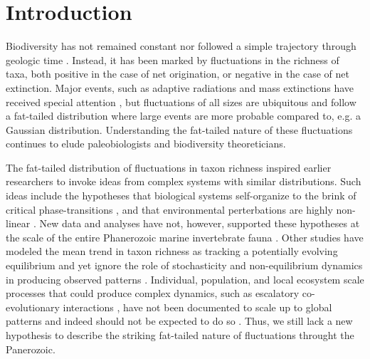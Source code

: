 \documentclass[12pt]{article}
\let\citep=\cite
\begin{document}
\section{Introduction}

Biodiversity has not remained constant nor followed a simple
trajectory through geologic time \citep{raup1982, sepkoski1984,
  gilinsky1994, liow2007, alroy08}.  Instead, it has been marked by
fluctuations in the richness of taxa, both positive in the case of net
origination, or negative in the case of net extinction. Major events,
such as adaptive radiations and mass extinctions have received special
attention \citep{benton1995, Erwin1998}, but fluctuations of all sizes
are ubiquitous \citep{sepkoski1984, alroy08, quental2013} and follow a
fat-tailed distribution where large events are more probable compared
to, e.g. a Gaussian distribution. Understanding the fat-tailed nature
of these fluctuations continues to elude paleobiologists and
biodiversity theoreticians.

The fat-tailed distribution of fluctuations in taxon richness inspired
earlier researchers to invoke ideas from complex systems with similar
distributions. Such ideas include the hypotheses that biological
systems self-organize to the brink of critical phase-transitions
\citep{bak1993, sole1997}, and that environmental perterbations are
highly non-linear \citep{newman1995}. New data and analyses have not,
however, supported these hypotheses at the scale of the entire
Phanerozoic marine invertebrate fauna \citep{kirchner1998, alroy08}.
Other studies have modeled the mean trend in taxon richness as
tracking a potentially evolving equilibrium \citep{sepkoski1984,
  alroy2010, rabosky2009ecolLett, marshall2016} and yet ignore the
role of stochasticity and non-equilibrium dynamics in producing
observed patterns \citep{erwin2012, liow2007, quental2013, harmon2015,
  jordan2016}. Individual, population, and local ecosystem scale
processes that could produce complex dynamics, such as escalatory
co-evolutionary interactions \citep{vermeij1987}, have not been
documented to scale up to global patterns \citep{madin2006} and indeed
should not be expected to do so \citep{vermeij2008}.  Thus, we still
lack a new hypothesis to describe the striking fat-tailed nature of
fluctuations throught the Panerozoic.
\end{document}
